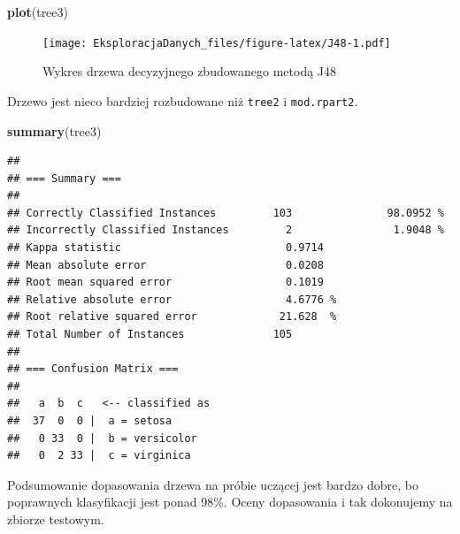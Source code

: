\documentclass[]{book}
\newenvironment{Shaded}{\begin{snugshade}}{\end{snugshade}}
\newcommand{\DataTypeTok}[1]{\textcolor[rgb]{0.13,0.29,0.53}{#1}}
\newcommand{\KeywordTok}[1]{\textcolor[rgb]{0.13,0.29,0.53}{\textbf{#1}}}
\newcommand{\NormalTok}[1]{#1}
\newcommand{\OperatorTok}[1]{\textcolor[rgb]{0.81,0.36,0.00}{\textbf{#1}}}
\newcommand{\StringTok}[1]{\textcolor[rgb]{0.31,0.60,0.02}{#1}}
\theoremstyle{plain}
\theoremstyle{definition}
\begin{document}
\begin{Shaded}
\begin{Highlighting}[]
\KeywordTok{plot}\NormalTok{(tree3)}
\end{Highlighting}
\end{Shaded}

\begin{figure}
\centering
\texttt{[image: EksploracjaDanych\_files/figure-latex/J48-1.pdf]}
\caption{\label{fig:J48}Wykres drzewa decyzyjnego zbudowanego metodą J48}
\end{figure}

Drzewo jest nieco bardziej rozbudowane niż \texttt{tree2} i \texttt{mod.rpart2}.

\begin{Shaded}
\begin{Highlighting}[]
\KeywordTok{summary}\NormalTok{(tree3)}
\end{Highlighting}
\end{Shaded}

\begin{verbatim}
## 
## === Summary ===
## 
## Correctly Classified Instances         103               98.0952 %
## Incorrectly Classified Instances         2                1.9048 %
## Kappa statistic                          0.9714
## Mean absolute error                      0.0208
## Root mean squared error                  0.1019
## Relative absolute error                  4.6776 %
## Root relative squared error             21.628  %
## Total Number of Instances              105     
## 
## === Confusion Matrix ===
## 
##   a  b  c   <-- classified as
##  37  0  0 |  a = setosa
##   0 33  0 |  b = versicolor
##   0  2 33 |  c = virginica
\end{verbatim}

Podsumowanie dopasowania drzewa na próbie uczącej jest bardzo dobre, bo poprawnych klasyfikacji jest ponad 98\%. Oceny dopasowania i tak dokonujemy na zbiorze testowym.

\begin{Shaded}
\end{Shaded}
\end{document}

